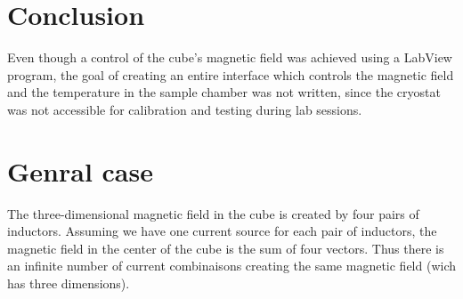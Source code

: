 \documentclass[journal]{IEEEtran}
\begin{document}
\section{Conclusion}


Even though a control of the cube's magnetic field was achieved using a LabView program, the goal of creating an  entire interface which controls the magnetic field and the temperature in the sample chamber was not written, since the cryostat was not accessible for calibration and testing during lab sessions.






%




\section*{Genral case}

The three-dimensional magnetic field in the cube is created by four pairs of inductors. Assuming we have one current source for each pair of inductors, the magnetic field in the center of the cube is the sum of four vectors. Thus there is an infinite number of current combinaisons creating the same magnetic field (wich has three dimensions).
\end{document}
